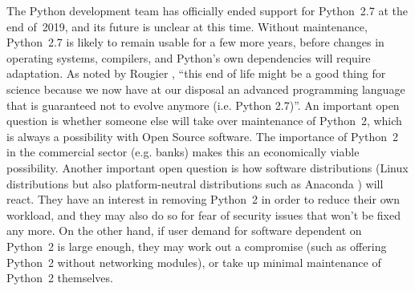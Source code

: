 The Python development team has officially ended support for Python~2.7 at the end of~2019, and its future is unclear at this time. Without maintenance, Python~2.7 is likely to remain usable for a few more years, before changes in operating systems, compilers, and Python's own dependencies will require adaptation. As noted by Rougier \cite{RougierRpLoupe2019}, ``this end of life might be a good thing for science because we now have at our disposal an advanced programming language that is guaranteed not to evolve anymore (i.e. Python 2.7)''. An important open question is whether someone else will take over maintenance of Python~2, which is always a possibility with Open Source software. The importance of Python~2 in the commercial sector (e.g. banks) makes this an economically viable possibility. Another important open question is how software distributions (Linux distributions but also platform-neutral distributions such as Anaconda \cite{AnacondaInc.Anacondasoftwaredistribution2020}) will react. They have an interest in removing Python~2 in order to reduce their own workload, and they may also do so for fear of security issues that won't be fixed any more. On the other hand, if user demand for software dependent on Python~2 is large enough, they may work out a compromise (such as offering Python~2 without networking modules), or take up minimal maintenance of Python~2 themselves.

\vspace{1mm}

